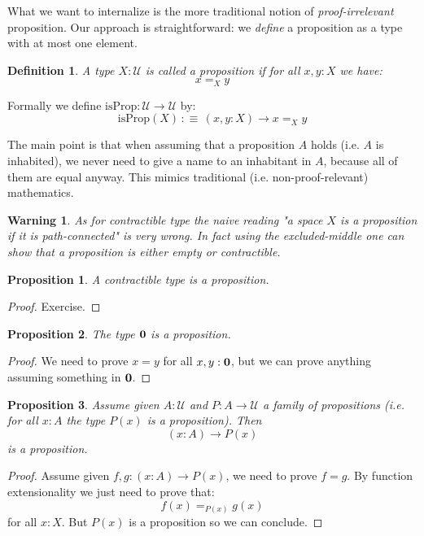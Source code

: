 \documentclass{article}
\newcommand{\U}{{\mathcal U}}
\renewcommand{\r}{\rightarrow}
\newcommand{\zero}{{\bf 0}}
\newcommand{\Prop}{\mathrm{Prop}}
\newtheorem{definition}{Definition}
\newtheorem{proposition}{Proposition}
\newtheorem{warning}{\danger Warning}
\begin{document}
What we want to internalize is the more traditional notion of \emph{proof-irrelevant} proposition. Our approach is straightforward: we \emph{define} a proposition as a type with at most one element.

\begin{definition}
A type $X:\U$ is called a proposition if for all $x,y:X$ we have: 
\[x=_X y\]

\end{definition}

Formally we define $\mathrm{isProp} : \U \r \U$ by: 
\[\mathrm{isProp}(X) \, :\equiv\,  (x,y:X)\r x=_X y\]

The main point is that when assuming that a proposition $A$ holds (i.e. $A$ is inhabited), we never need to give a name to an inhabitant in $A$, because all of them are equal anyway. This mimics traditional (i.e. non-proof-relevant) mathematics.

\begin{warning}
As for contractible type the naive reading "a space $X$ is a proposition if it is path-connected" is very wrong. In fact using the excluded-middle one can show that a proposition is either empty or contractible.
\end{warning}


\begin{proposition}
A contractible type is a proposition.
\end{proposition}
\begin{proof}
Exercise.
\end{proof}

\begin{proposition}
The type $\zero$ is a proposition.
\end{proposition}
\begin{proof}
We need to prove $x=y$ for all $x,y:\zero$, but we can prove anything assuming something in $\zero$.
\end{proof}

\begin{proposition}
Assume given $A:\U$ and $P:A\r \U$ a family of propositions (i.e. for all $x:A$ the type $P(x)$ is a proposition). Then 
\[(x:A)\r P(x)\]
is a proposition.
\end{proposition}
\begin{proof}
Assume given $f,g:(x:A)\r P(x)$, we need to prove $f=g$. By function extensionality we just need to prove that:
\[f(x)=_{P(x)}g(x)\]
for all $x:X$. But $P(x)$ is a proposition so we can conclude.
\end{proof}
\end{document}
